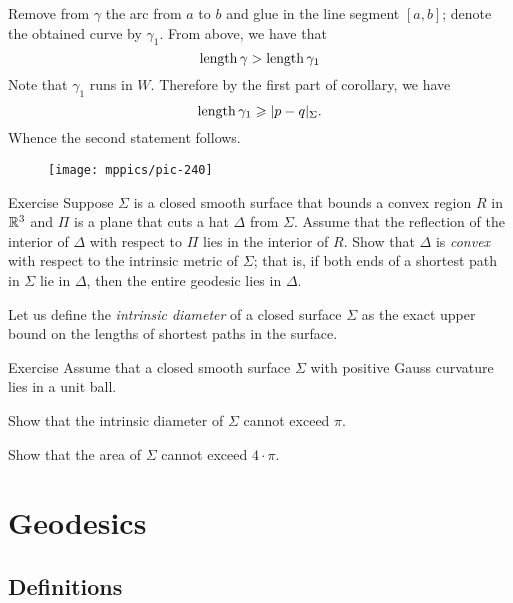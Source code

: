 Remove from $\gamma$ the arc from $a$ to $b$ and glue in the line segment $[a,b]$;
denote the obtained curve by $\gamma_1$. 
From above, we have that
\[\mathop{\rm length}\nolimits\gamma>\mathop{\rm length}\nolimits \gamma_1\]
Note that $\gamma_1$ runs in $W$.
Therefore by the first part of corollary, we have
\[\mathop{\rm length}\nolimits \gamma_1\geqslant |p-q|_\Sigma.\]
Whence the second statement follows.
\qeds

\begin{wrapfigure}{r}{27 mm}
\vskip0mm
\centering
\texttt{[image: mppics/pic-240]}
\end{wrapfigure}

\begin{thm}{Exercise}\label{ex:hat-convex}
Suppose $\Sigma$ is a closed smooth surface that bounds a convex region $R$ 
in $\mathbb{R}^3$
and $\Pi$ is a plane that cuts a hat $\Delta$ from $\Sigma$.
Assume that the reflection of the interior of $\Delta$ with respect to $\Pi$ lies in the interior of $R$.
Show that $\Delta$ is \emph{convex} with respect to the intrinsic metric  of $\Sigma$;
that is, 
if both ends of a shortest path in $\Sigma$ 
lie in $\Delta$,
then the entire geodesic lies in $\Delta$.
\end{thm}


Let us define the \emph{intrinsic diameter} of a closed surface $\Sigma$ as the exact upper bound on the lengths of shortest paths in the surface.

\begin{thm}{Exercise}\label{ex:intrinsic-diameter}
Assume that a closed smooth surface $\Sigma$ with positive Gauss curvature lies in a unit ball.

\begin{subthm}{} Show that the intrinsic diameter of $\Sigma$ cannot exceed $\pi$.
 
\end{subthm}

\begin{subthm}{}
Show that the area of $\Sigma$ cannot exceed $4\cdot \pi$.
\end{subthm}

\end{thm}

\chapter{Geodesics}


\section*{Definitions}


